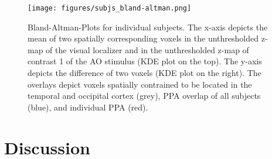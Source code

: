 \documentclass[english]{article}
\begin{document}
\begin{figure} \centering
    \texttt{[image: figures/subjs\_bland-altman.png]}
    \caption{Bland-Altman-Plots for individual subjects. The x-axis depicts the
        mean of two spatially corresponding voxels in the unthresholded z-map of
        the visual localizer and in the unthresholded z-map of contrast 1 of the
        AO stimulus (KDE plot on the top). The y-axis depicts the difference of
        two voxels (KDE plot on the right). The overlays depict voxels spatially
        contrained to be located in the temporal and occipital cortex (grey),
    PPA overlap of all subjects (blue), and individual PPA (red).}
    \label{fig:bland-altman} \end{figure}


\section{Discussion}









\end{document}

